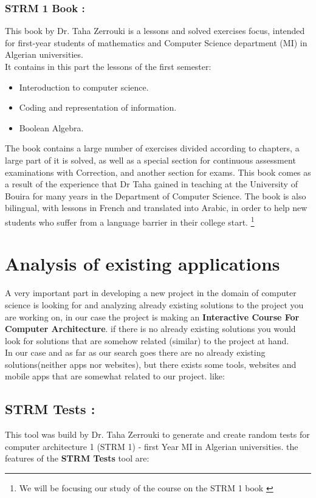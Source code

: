 \subsubsection{STRM 1 Book :}
This book by Dr. Taha Zerrouki is a lessons and solved exercises focus, intended for first-year students of mathematics and Computer Science department (MI) in 
Algerian universities.\cite{STRM-1-Book-Taha-Zerrouki}\\
It contains in this part the lessons of the first semester:
\begin{itemize}
	\item Interoduction to computer science.
	\item Coding and representation of information.
	\item Boolean Algebra.
\end{itemize}
The book contains a large number of exercises divided according to chapters, a large part of it is solved, as well as a special section for continuous assessment examinations with
Correction, and another section for exams.
This book comes as a result of the experience that Dr Taha gained in teaching at the University of Bouira for many years in the Department of Computer Science.
The book is also bilingual, with lessons in French and translated into Arabic, in order to help new students who suffer from a language barrier in their college start.
\footnote{We will be focusing our study of the course on the STRM 1 book \cite{STRM-1-Book-Taha-Zerrouki}}



 \section{Analysis of existing applications}
 A very important part in developing a new project in the domain of computer science is looking for and analyzing already
  existing solutions to the project you are working on, in our case the project is making an \textbf{Interactive Course For Computer Architecture}.
  if there is no already existing solutions you would look for solutions that are somehow related (similar) to the project at hand.\\
  In our case and as far as our search goes there are no already existing solutions(neither apps nor websites), but there exists some tools, websites and mobile apps that are somewhat related to our project. like:


 \subsection{STRM Tests :}
 This tool was build by  Dr. Taha Zerrouki to generate and create random tests for computer architecture 1 (STRM 1) - first Year MI in Algerian universities.\cite{STRM-Tests}
 the features of the \textbf{STRM Tests} tool\cite{STRM-Tests} are:

